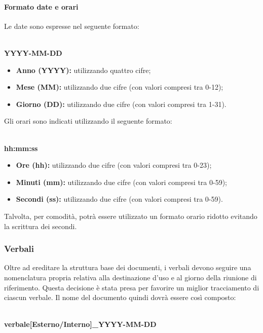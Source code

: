   \paragraph{Formato date e orari}
  Le date sono espresse nel seguente formato:\\\\ 
  \centerline{\textbf{YYYY-MM-DD}} 
  \begin{itemize}
  	\item \textbf{Anno (YYYY):} utilizzando quattro cifre;
  	\item \textbf{Mese (MM):} utilizzando due cifre (con valori compresi tra 0-12);
  	\item \textbf{Giorno (DD):} utilizzando due cifre (con valori compresi tra 1-31).
  \end{itemize}
  Gli orari sono indicati utilizzando il seguente formato:\\\\
  \centerline{\textbf{hh:mm:ss}} 
  \begin{itemize}
  	\item \textbf{Ore (hh):} utilizzando due cifre (con valori compresi tra 0-23);
  	\item \textbf{Minuti (mm):} utilizzando due cifre (con valori compresi tra 0-59);
  	\item \textbf{Secondi (ss):} utilizzando due cifre (con valori compresi tra 0-59).
  \end{itemize}
  Talvolta, per comodità, potrà essere utilizzato un formato orario ridotto evitando la scrittura dei secondi.
    
  
  \subsubsection{Verbali}
  Oltre ad ereditare la struttura base dei documenti, i verbali devono seguire
  una nomenclatura propria relativa alla destinazione d'uso e al giorno della riunione di riferimento.
  Questa decisione è stata presa per favorire un miglior tracciamento di ciascun verbale.
  Il nome del documento quindi dovrà essere così composto:\\\\
  \centerline{\textbf{verbale[Esterno/Interno]\_YYYY-MM-DD}} 
  

